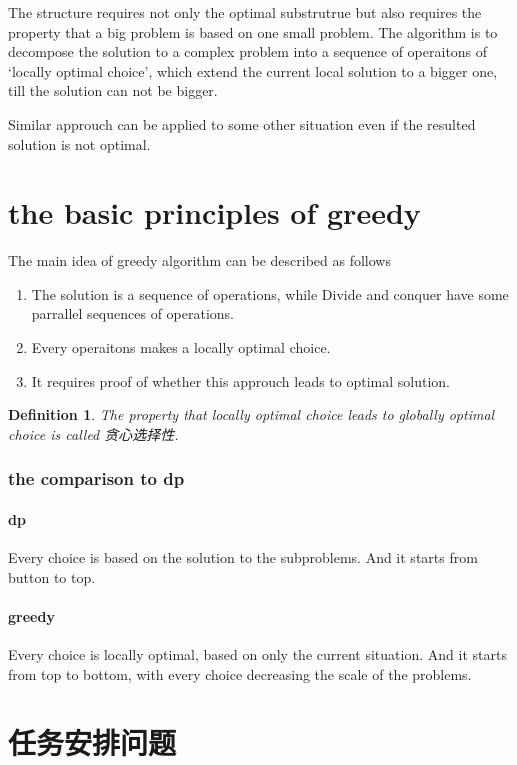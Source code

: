 \documentclass[a4paper, 10pt]{ctexart} %
\newtheorem{definition}{Definition}
\begin{document}
The structure requires not only the optimal substrutrue but also 
requires the property that a big problem is based on one small 
problem. The algorithm is to 
decompose the solution to a complex problem into 
a sequence of operaitons of `locally optimal choice',
which extend the current local solution 
to a bigger one, till the solution can not 
be bigger.

Similar approuch can be applied to 
some other situation even 
if the resulted solution is not 
optimal.
\section{the basic principles of greedy}
The main idea of greedy algorithm can be described as follows
\begin{enumerate}
    \item The solution is a sequence of operations, while Divide and 
    conquer have some parrallel sequences of operations.
    \item Every operaitons makes a locally optimal choice.
    \item It requires proof of whether this approuch 
    leads to optimal solution.
\end{enumerate}
\begin{definition}
    The property that locally optimal choice leads 
    to globally optimal choice is called
    贪心选择性.
\end{definition}

\subsubsection{the comparison to dp}
\paragraph{dp} %
\label{par:dp}
Every choice is based on the solution to 
the subproblems. And it starts from button to top.
\paragraph{greedy} %
\label{par:greedy}
Every choice is locally optimal, based on only the 
current situation. And it starts from top to bottom, with 
every choice decreasing the scale of the problems.
\section{任务安排问题}
\end{document}
